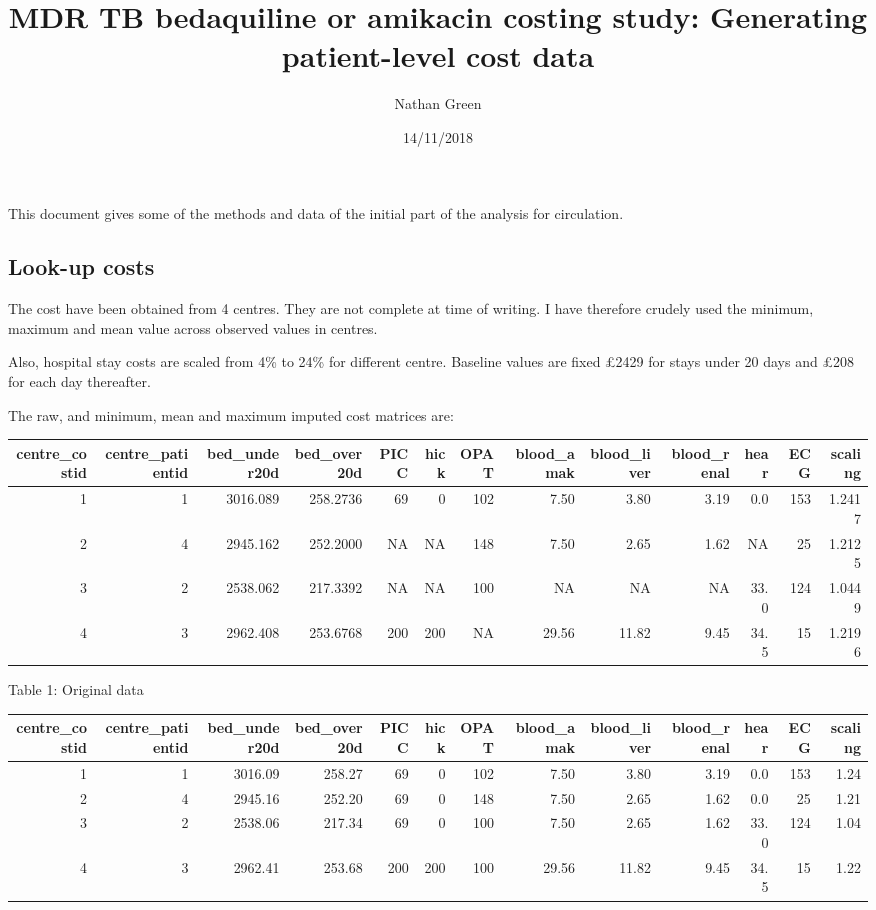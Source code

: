 \documentclass[]{article}
\title{MDR TB bedaquiline or amikacin costing study: Generating patient-level
cost data}
\author{Nathan Green}
\date{14/11/2018}
\begin{document}
\maketitle

This document gives some of the methods and data of the initial part of
the analysis for circulation.

\hypertarget{look-up-costs}{%
\subsection{Look-up costs}\label{look-up-costs}}

The cost have been obtained from 4 centres. They are not complete at
time of writing. I have therefore crudely used the minimum, maximum and
mean value across observed values in centres.

Also, hospital stay costs are scaled from 4\% to 24\% for different
centre. Baseline values are fixed £2429 for stays under 20 days and £208
for each day thereafter.

The raw, and minimum, mean and maximum imputed cost matrices are:

\begin{longtable}[]{@{}rrrrrrrrrrrrr@{}}
\toprule
centre\_costid & centre\_patientid & bed\_under20d & bed\_over20d & PICC
& hick & OPAT & blood\_amak & blood\_liver & blood\_renal & hear & ECG &
scaling\tabularnewline
\midrule
\endhead
1 & 1 & 3016.089 & 258.2736 & 69 & 0 & 102 & 7.50 & 3.80 & 3.19 & 0.0 &
153 & 1.2417\tabularnewline
2 & 4 & 2945.162 & 252.2000 & NA & NA & 148 & 7.50 & 2.65 & 1.62 & NA &
25 & 1.2125\tabularnewline
3 & 2 & 2538.062 & 217.3392 & NA & NA & 100 & NA & NA & NA & 33.0 & 124
& 1.0449\tabularnewline
4 & 3 & 2962.408 & 253.6768 & 200 & 200 & NA & 29.56 & 11.82 & 9.45 &
34.5 & 15 & 1.2196\tabularnewline
\bottomrule
\end{longtable}

Table 1: Original data

\begin{longtable}[]{@{}rrrrrrrrrrrrr@{}}
\toprule
centre\_costid & centre\_patientid & bed\_under20d & bed\_over20d & PICC
& hick & OPAT & blood\_amak & blood\_liver & blood\_renal & hear & ECG &
scaling\tabularnewline
\midrule
\endhead
1 & 1 & 3016.09 & 258.27 & 69 & 0 & 102 & 7.50 & 3.80 & 3.19 & 0.0 & 153
& 1.24\tabularnewline
2 & 4 & 2945.16 & 252.20 & 69 & 0 & 148 & 7.50 & 2.65 & 1.62 & 0.0 & 25
& 1.21\tabularnewline
3 & 2 & 2538.06 & 217.34 & 69 & 0 & 100 & 7.50 & 2.65 & 1.62 & 33.0 &
124 & 1.04\tabularnewline
4 & 3 & 2962.41 & 253.68 & 200 & 200 & 100 & 29.56 & 11.82 & 9.45 & 34.5
& 15 & 1.22\tabularnewline
\bottomrule
\end{longtable}
\end{document}

